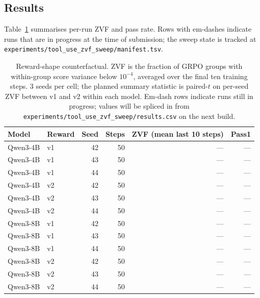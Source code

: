 \subsection{Results}
Table~\ref{tab:zvf_counterfactual} summarises per-run ZVF and pass rate.
Rows with em-dashes indicate runs that are in progress at the time of
submission; the sweep state is tracked at
\texttt{experiments/tool\_use\_zvf\_sweep/manifest.tsv}.

\begin{table}[h]
\centering
\small
\begin{tabular}{llrrrr}
\toprule
Model & Reward & Seed & Steps & ZVF (mean last 10 steps) & Pass\@1 \\
\midrule
Qwen3-4B & v1 & 42 & 50 & --- & --- \\
Qwen3-4B & v1 & 43 & 50 & --- & --- \\
Qwen3-4B & v1 & 44 & 50 & --- & --- \\
Qwen3-4B & v2 & 42 & 50 & --- & --- \\
Qwen3-4B & v2 & 43 & 50 & --- & --- \\
Qwen3-4B & v2 & 44 & 50 & --- & --- \\
\midrule
Qwen3-8B & v1 & 42 & 50 & --- & --- \\
Qwen3-8B & v1 & 43 & 50 & --- & --- \\
Qwen3-8B & v1 & 44 & 50 & --- & --- \\
Qwen3-8B & v2 & 42 & 50 & --- & --- \\
Qwen3-8B & v2 & 43 & 50 & --- & --- \\
Qwen3-8B & v2 & 44 & 50 & --- & --- \\
\bottomrule
\end{tabular}
\caption{Reward-shape counterfactual. ZVF is the fraction of GRPO groups
with within-group score variance below \(10^{-4}\), averaged over the final
ten training steps. \(3\) seeds per cell; the planned summary statistic is
paired-\(t\) on per-seed ZVF between v1 and v2 within each model. Em-dash
rows indicate runs still in progress; values will be spliced in from
\texttt{experiments/tool\_use\_zvf\_sweep/results.csv} on the next build.}
\label{tab:zvf_counterfactual}
\end{table}

